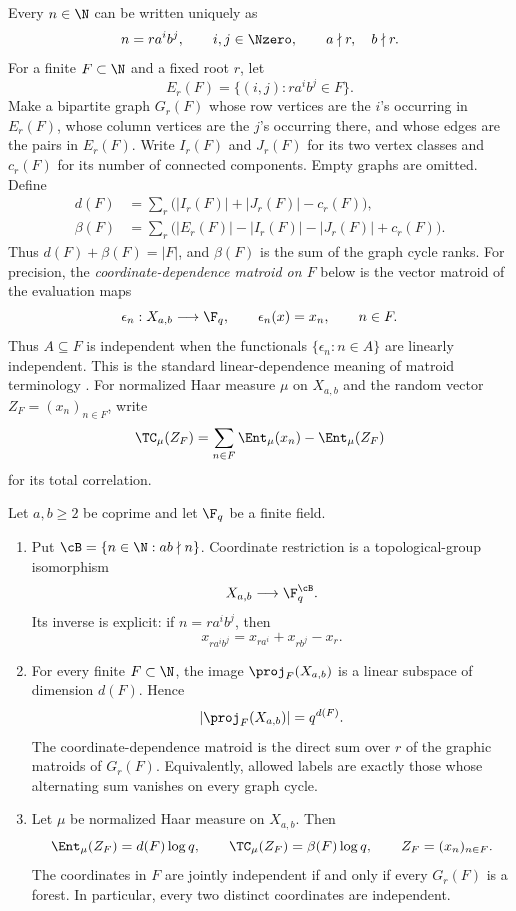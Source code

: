 Every $n\in\N$ can be written uniquely as
\[
 n=r a^i b^j,
 \qquad i,j\in\Nzero,
 \qquad a\nmid r,\quad b\nmid r.
\]
For a finite $F\subset\N$ and a fixed root $r$, let
\[
 E_r(F)=\{(i,j):r a^i b^j\in F\}.
\]
Make a bipartite graph $G_r(F)$ whose row vertices are the $i$'s occurring in
$E_r(F)$, whose column vertices are the $j$'s occurring there, and whose
edges are the pairs in $E_r(F)$.  Write $I_r(F)$ and $J_r(F)$ for its two
vertex classes and $c_r(F)$ for its number of connected components.  Empty
graphs are omitted.  Define
\begin{align}
 d(F)&=\sum_r\bigl(|I_r(F)|+|J_r(F)|-c_r(F)\bigr),
 \label{eq:dF}\\
 \beta(F)&=\sum_r\bigl(|E_r(F)|-|I_r(F)|-|J_r(F)|+c_r(F)\bigr).
 \label{eq:betaF}
\end{align}
Thus $d(F)+\beta(F)=|F|$, and $\beta(F)$ is the sum of the graph cycle ranks.
For precision, the \emph{coordinate-dependence matroid on $F$} below is the
vector matroid of the evaluation maps
\[
 \epsilon_n:X_{a,b}\longrightarrow\F_q,
 \qquad \epsilon_n(x)=x_n,\qquad n\in F.
\]
Thus $A\subseteq F$ is independent when the functionals
$\{\epsilon_n:n\in A\}$ are linearly independent.  This is the standard
linear-dependence meaning of matroid terminology \citep{Whitney1935}.
For normalized Haar measure $\mu$ on $X_{a,b}$ and the random vector
$Z_F=(x_n)_{n\in F}$, write
\[
 \TC_\mu(Z_F)=\sum_{n\in F}\Ent_\mu(x_n)-\Ent_\mu(Z_F)
\]
for its total correlation.

\begin{theorem}\label{thm:main}
Let $a,b\geq2$ be coprime and let $\F_q$ be a finite field.
\begin{enumerate}
\item Put $\cB=\{n\in\N:ab\nmid n\}$.  Coordinate restriction is a
topological-group isomorphism
\[
 X_{a,b}\longrightarrow\F_q^{\cB}.
\]
Its inverse is explicit: if $n=r a^i b^j$, then
\begin{equation}\label{eq:global-inverse-intro}
 x_{r a^i b^j}=x_{r a^i}+x_{r b^j}-x_r.
\end{equation}
\item For every finite $F\subset\N$, the image $\proj_F(X_{a,b})$ is a
linear subspace of dimension $d(F)$.  Hence
\begin{equation}\label{eq:finite-count-intro}
 |\proj_F(X_{a,b})|=q^{d(F)}.
\end{equation}
The coordinate-dependence matroid is the direct sum over $r$ of the graphic
matroids of $G_r(F)$.  Equivalently, allowed labels are exactly those whose
alternating sum vanishes on every graph cycle.
\item Let $\mu$ be normalized Haar measure on $X_{a,b}$.  Then
\begin{equation}\label{eq:haar-intro}
 \Ent_\mu(Z_F)=d(F)\log q,
 \qquad
 \TC_\mu(Z_F)=\beta(F)\log q,
 \qquad Z_F=(x_n)_{n\in F}.
\end{equation}
The coordinates in $F$ are jointly independent if and only if every
$G_r(F)$ is a forest.  In particular, every two distinct coordinates are
independent.
\end{enumerate}
\end{theorem}

